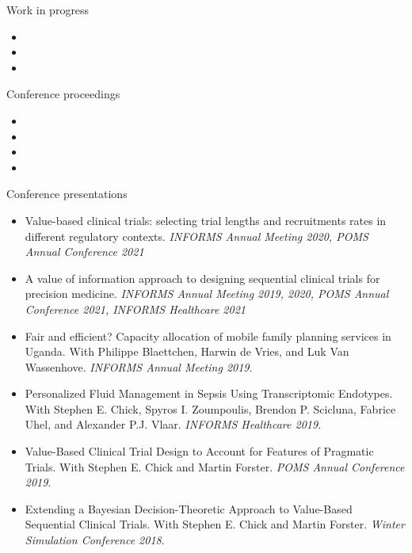 \documentclass{resume}
\begin{document}
\begin{rSection}{Work in progress}
\begin{itemize}
  \item {}
  \item {}
  \item {}
\end{itemize}
\end{rSection}


\begin{rSection}{Conference proceedings}
\begin{itemize}
\item {}
\item {}
\item {}
\item {}
\end{itemize}

\end{rSection}

\begin{rSection}{Conference presentations}

\begin{itemize}
\item Value-based clinical trials: selecting trial lengths and recruitments rates in different regulatory contexts. \textit{INFORMS Annual Meeting 2020, POMS Annual Conference 2021}
\item A value of information approach to designing sequential clinical trials for precision medicine. \textit{INFORMS Annual Meeting 2019, 2020, POMS Annual Conference 2021, INFORMS Healthcare 2021}
\item Fair and efficient? Capacity allocation of mobile family planning services in Uganda. With Philippe Blaettchen, Harwin de Vries, and Luk Van Wassenhove. \textit{INFORMS Annual Meeting 2019}.
\item Personalized Fluid Management in Sepsis Using Transcriptomic Endotypes. With Stephen E. Chick, Spyros I. Zoumpoulis, Brendon P. Scicluna, Fabrice Uhel, and Alexander P.J. Vlaar. \textit{INFORMS Healthcare 2019}.
\item Value-Based Clinical Trial Design to Account for Features of Pragmatic Trials. With Stephen E. Chick and Martin Forster. \textit{POMS Annual Conference 2019}.
\item Extending a Bayesian Decision-Theoretic Approach to Value-Based Sequential Clinical Trials. With Stephen E. Chick and Martin Forster. \textit{Winter Simulation Conference 2018}.
\end{itemize}

\end{rSection}
\end{document}
